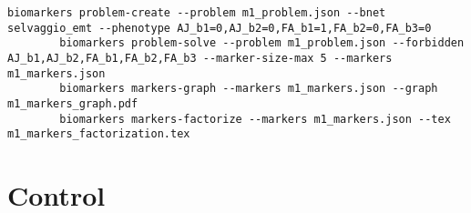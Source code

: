 \documentclass[11pt]{article}
\begin{document}
        \begin{lstlisting}[label={lst:lstlisting},basicstyle=\ttfamily,columns=fullflexible,breakindent=0pt,breakatwhitespace,]
        biomarkers problem-create --problem m1_problem.json --bnet selvaggio_emt --phenotype AJ_b1=0,AJ_b2=0,FA_b1=1,FA_b2=0,FA_b3=0
        biomarkers problem-solve --problem m1_problem.json --forbidden AJ_b1,AJ_b2,FA_b1,FA_b2,FA_b3 --marker-size-max 5 --markers m1_markers.json
        biomarkers markers-graph --markers m1_markers.json --graph m1_markers_graph.pdf
        biomarkers markers-factorize --markers m1_markers.json --tex m1_markers_factorization.tex
        \end{lstlisting}

        


    \section{Control}\label{sec:control}


    
    
\end{document}
